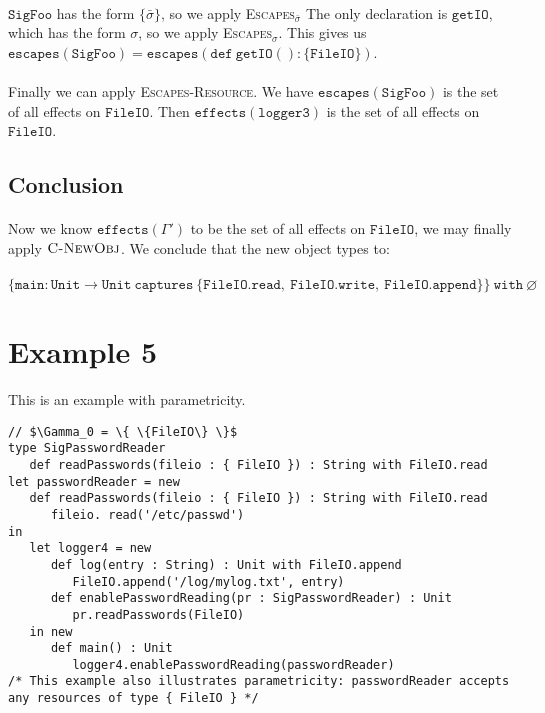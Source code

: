 \documentclass{llncs}
\newcommand{\keywadj}[1]{\mathtt{#1}}
\begin{document}
\paragraph{}
$\keywadj{SigFoo}$ has the form $\{ \bar \sigma \}$, so we apply \textsc{Escapes$_{\bar \sigma}$} The only declaration is $\keywadj{getIO}$, which has the form $\sigma$, so we apply \textsc{Escapes$_\sigma$}. This gives us $\keywadj{escapes(SigFoo) = escapes(def~getIO() : \{ FileIO \})}$.

\paragraph{}
Finally we can apply \textsc{Escapes-Resource}. We have $\keywadj{escapes(SigFoo)}$ is the set of all effects on $\keywadj{FileIO}$. Then $\keywadj{effects(logger3)}$ is the set of all effects on $\keywadj{FileIO}$.

\subsection*{Conclusion}

\paragraph{}
Now we know $\keywadj{effects(\Gamma')}$ to be the set of all effects on $\keywadj{FileIO}$, we may finally apply $\textsc{C-NewObj}$. We conclude that the new object types to:

\paragraph{}
 $\keywadj{\{main : Unit \rightarrow Unit~captures~\{FileIO.read,~FileIO.write,~FileIO.append\} \}~with~\varnothing}$

\section{Example 5}

This is an example with parametricity.

\vspace{-6pt}
\begin{lstlisting}[xleftmargin=20pt]
// $\Gamma_0 = \{ \{FileIO\} \}$
type SigPasswordReader
   def readPasswords(fileio : { FileIO }) : String with FileIO.read
let passwordReader = new
   def readPasswords(fileio : { FileIO }) : String with FileIO.read
      fileio. read('/etc/passwd')
in
   let logger4 = new
      def log(entry : String) : Unit with FileIO.append
         FileIO.append('/log/mylog.txt', entry)
      def enablePasswordReading(pr : SigPasswordReader) : Unit
         pr.readPasswords(FileIO)
   in new
      def main() : Unit
         logger4.enablePasswordReading(passwordReader)
/* This example also illustrates parametricity: passwordReader accepts any resources of type { FileIO } */
\end{lstlisting}
\end{document}

